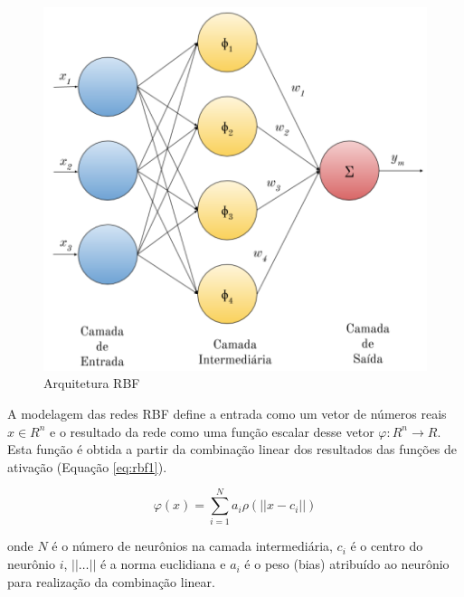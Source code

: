 \documentclass[msc, classic, a4paper]{ufbathesis}
\begin{document}
\begin{figure}[H]
\begin{center}
    \includegraphics[scale=1]{imagens/rbf_arq.png}
    \caption{Arquitetura RBF}
    \label{fig:rbg_arq}
\end{center}
\end{figure}

A modelagem das redes RBF define a entrada como um vetor de números reais ${x} \in {R} ^{n}$ e o resultado da rede como uma função escalar desse vetor $\varphi : {R} ^{n} \to {R}$.
Esta função é obtida a partir da combinação linear dos resultados das funções de ativação (Equação \ref{eq:rbf1}).

\begin{equation} \label{eq:rbf1}
    \varphi ({x})=\sum _{{i=1}}^{N}a_{i}\rho (||{x}-{c}_{i}||)
\end{equation}


onde $N$ é o número de neurônios na camada intermediária, ${c}_{i}$ é o centro do neurônio $i$, $||\ldots||$ é a norma euclidiana e $a_{i}$ é o peso (bias) atribuído ao neurônio para realização da combinação linear.

\end{document}

